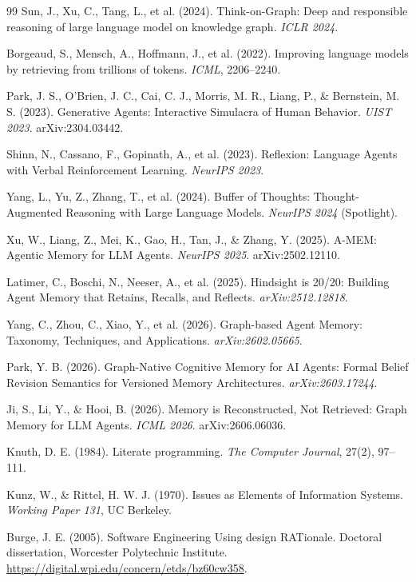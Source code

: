 \begin{thebibliography}{99}
Sun, J., Xu, C., Tang, L., et al. (2024).
Think-on-Graph: Deep and responsible reasoning of large language model on knowledge graph.
\textit{ICLR 2024}.

Borgeaud, S., Mensch, A., Hoffmann, J., et al. (2022).
Improving language models by retrieving from trillions of tokens.
\textit{ICML}, 2206--2240.

Park, J. S., O'Brien, J. C., Cai, C. J., Morris, M. R., Liang, P., \& Bernstein, M. S. (2023).
Generative Agents: Interactive Simulacra of Human Behavior.
\textit{UIST 2023}. arXiv:2304.03442.

Shinn, N., Cassano, F., Gopinath, A., et al. (2023).
Reflexion: Language Agents with Verbal Reinforcement Learning.
\textit{NeurIPS 2023}.

Yang, L., Yu, Z., Zhang, T., et al. (2024).
Buffer of Thoughts: Thought-Augmented Reasoning with Large Language Models.
\textit{NeurIPS 2024} (Spotlight).

Xu, W., Liang, Z., Mei, K., Gao, H., Tan, J., \& Zhang, Y. (2025).
A-MEM: Agentic Memory for LLM Agents.
\textit{NeurIPS 2025}. arXiv:2502.12110.

Latimer, C., Boschi, N., Neeser, A., et al. (2025).
Hindsight is 20/20: Building Agent Memory that Retains, Recalls, and Reflects.
\textit{arXiv:2512.12818}.

Yang, C., Zhou, C., Xiao, Y., et al. (2026).
Graph-based Agent Memory: Taxonomy, Techniques, and Applications.
\textit{arXiv:2602.05665}.

Park, Y. B. (2026).
Graph-Native Cognitive Memory for AI Agents: Formal Belief Revision Semantics for Versioned Memory Architectures.
\textit{arXiv:2603.17244}.

Ji, S., Li, Y., \& Hooi, B. (2026).
Memory is Reconstructed, Not Retrieved: Graph Memory for LLM Agents.
\textit{ICML 2026}. arXiv:2606.06036.

Knuth, D. E. (1984).
Literate programming.
\textit{The Computer Journal}, 27(2), 97--111.

Kunz, W., \& Rittel, H. W. J. (1970).
Issues as Elements of Information Systems.
\textit{Working Paper 131}, UC Berkeley.

Burge, J. E. (2005).
Software Engineering Using design RATionale.
Doctoral dissertation, Worcester Polytechnic Institute.
\url{https://digital.wpi.edu/concern/etds/bz60cw358}.


\end{thebibliography}
